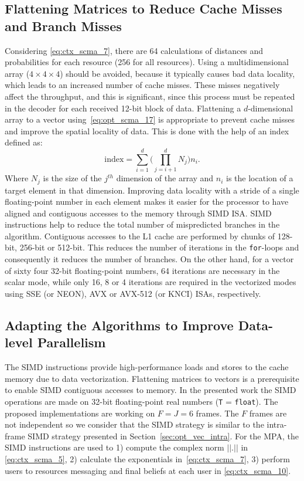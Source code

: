 \subsection{Flattening Matrices to Reduce Cache Misses and Branch Misses}
\label{sec:opt_scma_flattening}

Considering \eqref{eq:ctx_scma_7}, there are 64 calculations of distances and
probabilities for each resource (256 for all resources). Using a
multidimensional array ($4\times4\times4$) should be avoided, because it
typically causes bad data locality, which leads to an increased number of cache
misses. These misses negatively affect the throughput, and this is significant,
since this process must be repeated in the decoder for each received 12-bit
block of data. Flattening a $d$-dimensional array to a vector
using~\eqref{eq:opt_scma_17} is appropriate to prevent cache misses and improve
the spatial locality of data. This is done with the help of an index defined as:
\begin{equation}
  \label{eq:opt_scma_17}
  \text{index} = \sum\limits_{i=1}^d\Bigg( \prod\limits_{j=i+1}^d N_j \Bigg)n_i.
\end{equation}
Where $N_j$ is the size of the $j^{th}$ dimension of the array and $n_i$ is the
location of a target element in that dimension. Improving data locality with
a stride of a single floating-point number in each element makes it easier for
the processor to have aligned and contiguous accesses to the memory through SIMD
ISA. SIMD instructions help to reduce the total number of mispredicted branches
in the algorithm. Contiguous accesses to the L1 cache are performed by chunks of
128-bit, 256-bit or 512-bit. This reduces the number of iterations in the
\verb|for|-loops and consequently it reduces the number of branches. On the
other hand, for a vector of sixty four 32-bit floating-point numbers, 64
iterations are necessary in the scalar mode, while only 16, 8 or 4 iterations
are required in the vectorized modes using SSE (or NEON), AVX or
AVX-512 (or KNCI) ISAs, respectively.

\subsection{Adapting the Algorithms to Improve Data-level Parallelism}
\label{sec:opt_scma_adapting_algorithms}

The SIMD instructions provide high-performance loads and stores to the cache
memory due to data vectorization. Flattening matrices to vectors is a
prerequisite to enable SIMD contiguous accesses to memory. In the presented work
the SIMD operations are made on 32-bit floating-point real numbers (\verb|T| =
\verb|float|). The proposed implementations are working on $F = J = 6$ frames.
The $F$ frames are not independent so we consider that the SIMD strategy is
similar to the intra-frame SIMD strategy presented in
Section~\ref{sec:opt_vec_intra}. For the MPA, the SIMD instructions are used to
1) compute the complex norm $||.||$ in \eqref{eq:ctx_scma_5}, 2) calculate the
exponentials in~\eqref{eq:ctx_scma_7}, 3) perform users to resources messaging
and final beliefs at each user in \eqref{eq:ctx_scma_10}.

